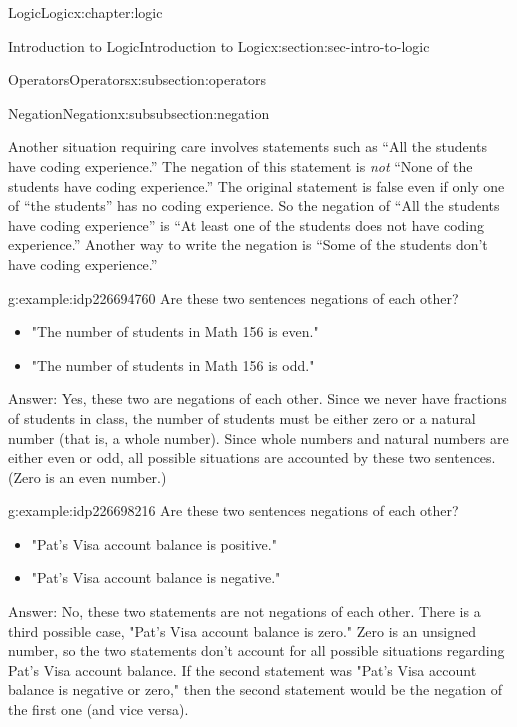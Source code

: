 \documentclass[twoside,10pt,]{book}
\numberwithin{equation}{section}
\begin{document}
\begin{chapterptx}{Logic}{}{Logic}{}{}{x:chapter:logic}
\begin{sectionptx}{Introduction to Logic}{}{Introduction to Logic}{}{}{x:section:sec-intro-to-logic}
\begin{subsectionptx}{Operators}{}{Operators}{}{}{x:subsection:operators}
\begin{subsubsectionptx}{Negation}{}{Negation}{}{}{x:subsubsection:negation}
\par
Another situation requiring care involves statements such as ``All the students have coding experience.''  The negation of this statement is \emph{not} ``None of the students have coding experience.''  The original statement is false even if only one of ``the students'' has no coding experience.  So the negation of ``All the students have coding experience'' is ``At least one of the students does not have coding experience.''  Another way to write the negation is ``Some of the students don't have coding experience.''%
\begin{example}{}{g:example:idp226694760}%
Are these two sentences negations of each other?%
\begin{itemize}[label=\textbullet]
\item{}"The number of students in Math 156 is even."%
\item{}"The number of students in Math 156 is odd."%
\end{itemize}
Answer: Yes, these two are negations of each other.  Since we never have fractions of students in class, the number of students must be either zero or a natural number (that is, a whole number).  Since whole numbers and natural numbers are either even or odd, all possible situations are accounted by these two sentences.  (Zero is an even number.)%
\end{example}
\begin{example}{}{g:example:idp226698216}%
Are these two sentences negations of each other?%
\begin{itemize}[label=\textbullet]
\item{}"Pat's Visa account balance is positive."%
\item{}"Pat's Visa account balance is negative."%
\end{itemize}
Answer: No, these two statements are not negations of each other.  There is a third possible case, "Pat's Visa account balance is zero."  Zero is an unsigned number, so the two statements don't account for all possible situations regarding Pat's Visa account balance.  If the second statement was "Pat's Visa account balance is negative or zero," then the second statement would be the negation of the first one (and vice versa).%
\end{example}
\end{subsubsectionptx}
\end{subsectionptx}
%
%
\typeout{************************************************}

\end{sectionptx}
\end{chapterptx}
\end{document}
